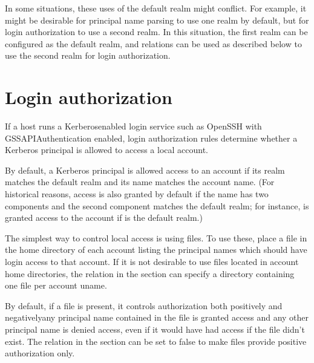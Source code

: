 \documentclass[letterpaper,10pt,english]{sphinxmanual}
\begin{document}
\sphinxAtStartPar
In some situations, these uses of the default realm might conflict.
For example, it might be desirable for principal name parsing to use
one realm by default, but for login authorization to use a second
realm.  In this situation, the first realm can be configured as the
default realm, and  relations can be used as
described below to use the second realm for login authorization.


\section{Login authorization}
\label{\detokenize{admin/host_config:login-authorization}}\label{\detokenize{admin/host_config:id1}}
\sphinxAtStartPar
If a host runs a Kerberos\sphinxhyphen{}enabled login service such as OpenSSH with
GSSAPIAuthentication enabled, login authorization rules determine
whether a Kerberos principal is allowed to access a local account.

\sphinxAtStartPar
By default, a Kerberos principal is allowed access to an account if
its realm matches the default realm and its name matches the account
name.  (For historical reasons, access is also granted by default if
the name has two components and the second component matches the
default realm; for instance, 
is granted access to the  account if  is
the default realm.)

\sphinxAtStartPar
The simplest way to control local access is using 
files.  To use these, place a  file in the home directory
of each account listing the principal names which should have login
access to that account.  If it is not desirable to use 
files located in account home directories, the 
relation in the {\hyperref[\detokenize{admin/conf_files/krb5_conf:libdefaults}]{}} section can specify a directory
containing one file per account uname.

\sphinxAtStartPar
By default, if a  file is present, it controls
authorization both positively and negatively\textendash{}any principal name
contained in the file is granted access and any other principal name
is denied access, even if it would have had access if the 
file didn’t exist.  The  relation in the
{\hyperref[\detokenize{admin/conf_files/krb5_conf:libdefaults}]{}} section can be set to false to make 
files provide positive authorization only.
\end{document}
